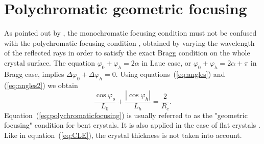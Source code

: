 \documentclass[preprint]{iucr}              %
\newcommand{\inred}[1]{{\color{red}#1}}
\begin{document}
\section{Polychromatic geometric focusing}
\label{sec:polychromatic}
%

As pointed out by \cite{CK}, the monochromatic focusing \inred{condition} must not be confused with the polychromatic focusing \inred{condition} \cite{handbook,Caciuffo1987,Schulze1998,Martinson}, obtained by varying the wavelength of the reflected rays in order to satisfy the exact Bragg condition on the \inred{whole} crystal surface.
The equation $\varphi_0+\varphi_h=2\alpha$ in Laue case\inred{, or $\varphi_0+\varphi_h=2\alpha+\pi$ in Bragg case,} implies $\Delta\varphi_0+\Delta\varphi_h=0$. Using equations~(\ref{eq:angles}) and  (\ref{eq:angles2}) we obtain
\begin{equation}
\label{eq:polychromaticfocusing}
\frac{{\cos {\varphi _o}}}{{{L_0}}} + \frac{{\left| {\cos {\varphi _h}} \right|}}{{{L_h}}} = \frac{2}{R_c}.
\end{equation}
Equation~(\ref{eq:polychromaticfocusing}) is usually referred to as the "geometric focusing" condition for bent crystals. It is also applied in the case of flat crystals \cite{sanchezdelrio1994}. \inred{Like in equation~(\ref{eq:CLE}), the crystal thickness is not taken into account.}
\end{document}
